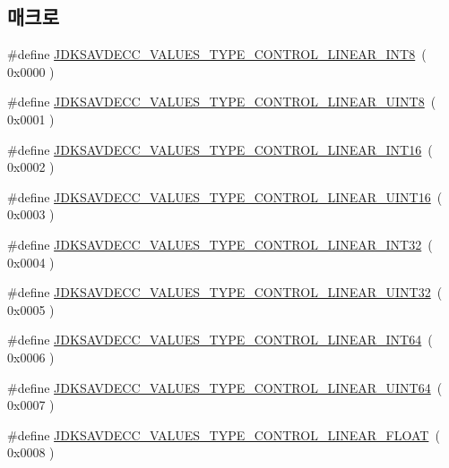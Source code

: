 \subsection*{매크로}
\begin{DoxyCompactItemize}
\item 
\#define \hyperlink{group__values__type_ga81656a7e4e4934294c23cb40cbb43b5d}{J\+D\+K\+S\+A\+V\+D\+E\+C\+C\+\_\+\+V\+A\+L\+U\+E\+S\+\_\+\+T\+Y\+P\+E\+\_\+\+C\+O\+N\+T\+R\+O\+L\+\_\+\+L\+I\+N\+E\+A\+R\+\_\+\+I\+N\+T8}~( 0x0000 )
\item 
\#define \hyperlink{group__values__type_ga05c4c60e60c63b01d8cb9e49c67ca05b}{J\+D\+K\+S\+A\+V\+D\+E\+C\+C\+\_\+\+V\+A\+L\+U\+E\+S\+\_\+\+T\+Y\+P\+E\+\_\+\+C\+O\+N\+T\+R\+O\+L\+\_\+\+L\+I\+N\+E\+A\+R\+\_\+\+U\+I\+N\+T8}~( 0x0001 )
\item 
\#define \hyperlink{group__values__type_gaabaf3950f1fda5b9d86d540518721706}{J\+D\+K\+S\+A\+V\+D\+E\+C\+C\+\_\+\+V\+A\+L\+U\+E\+S\+\_\+\+T\+Y\+P\+E\+\_\+\+C\+O\+N\+T\+R\+O\+L\+\_\+\+L\+I\+N\+E\+A\+R\+\_\+\+I\+N\+T16}~( 0x0002 )
\item 
\#define \hyperlink{group__values__type_ga305aab91d8f002e38cc6c1898e4f9ea4}{J\+D\+K\+S\+A\+V\+D\+E\+C\+C\+\_\+\+V\+A\+L\+U\+E\+S\+\_\+\+T\+Y\+P\+E\+\_\+\+C\+O\+N\+T\+R\+O\+L\+\_\+\+L\+I\+N\+E\+A\+R\+\_\+\+U\+I\+N\+T16}~( 0x0003 )
\item 
\#define \hyperlink{group__values__type_gaccc847643a8c9f509158abbb680e47a2}{J\+D\+K\+S\+A\+V\+D\+E\+C\+C\+\_\+\+V\+A\+L\+U\+E\+S\+\_\+\+T\+Y\+P\+E\+\_\+\+C\+O\+N\+T\+R\+O\+L\+\_\+\+L\+I\+N\+E\+A\+R\+\_\+\+I\+N\+T32}~( 0x0004 )
\item 
\#define \hyperlink{group__values__type_gada49116cdddaf1beea57f7df8786e0c1}{J\+D\+K\+S\+A\+V\+D\+E\+C\+C\+\_\+\+V\+A\+L\+U\+E\+S\+\_\+\+T\+Y\+P\+E\+\_\+\+C\+O\+N\+T\+R\+O\+L\+\_\+\+L\+I\+N\+E\+A\+R\+\_\+\+U\+I\+N\+T32}~( 0x0005 )
\item 
\#define \hyperlink{group__values__type_ga57cfab5e9b0ef8080867ee955afa7307}{J\+D\+K\+S\+A\+V\+D\+E\+C\+C\+\_\+\+V\+A\+L\+U\+E\+S\+\_\+\+T\+Y\+P\+E\+\_\+\+C\+O\+N\+T\+R\+O\+L\+\_\+\+L\+I\+N\+E\+A\+R\+\_\+\+I\+N\+T64}~( 0x0006 )
\item 
\#define \hyperlink{group__values__type_ga0ca9ba7b0b79f0c09f94902d45bf24ea}{J\+D\+K\+S\+A\+V\+D\+E\+C\+C\+\_\+\+V\+A\+L\+U\+E\+S\+\_\+\+T\+Y\+P\+E\+\_\+\+C\+O\+N\+T\+R\+O\+L\+\_\+\+L\+I\+N\+E\+A\+R\+\_\+\+U\+I\+N\+T64}~( 0x0007 )
\item 
\#define \hyperlink{group__values__type_ga60da13179f9247229fc1991bbedcf612}{J\+D\+K\+S\+A\+V\+D\+E\+C\+C\+\_\+\+V\+A\+L\+U\+E\+S\+\_\+\+T\+Y\+P\+E\+\_\+\+C\+O\+N\+T\+R\+O\+L\+\_\+\+L\+I\+N\+E\+A\+R\+\_\+\+F\+L\+O\+AT}~( 0x0008 )

\end{DoxyCompactItemize}
